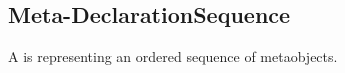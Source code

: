 \subsection{Meta-DeclarationSequence}
\label{concept-Meta-DeclarationSequence}

A  is representing an ordered sequence of metaobjects.





